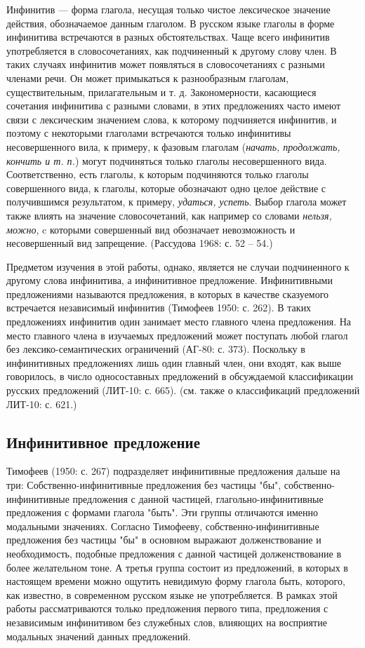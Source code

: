 Инфинитив --- форма глагола, несущая только чистое лексическое значение действия, обозначаемое данным глаголом. В русском языке глаголы в форме инфинитива встречаются в разных обстоятельствах. Чаще всего инфинитив употребляется в словосочетаниях, как подчиненный к другому слову член. В таких случаях инфинитив может появляться в словосочетаниях с разными членами речи. Он может примыкаться к разнообразным глаголам, существительным, прилагательным и т. д. Закономерности, касающиеся сочетания инфинитива с разными словами, в этих предложениях часто имеют связи с лексическим значением слова, к которому подчиняется инфинитив, и поэтому с некоторыми глаголами встречаются только инфинитивы несовершенного вила, к примеру, к фазовым глаголам (\textit{начать, продолжать, кончить и т. п.}) могут подчиняться только глаголы несовершенного вида. Соответственно, есть глаголы, к которым подчиняются только глаголы совершенного вида, к глаголы, которые обозначают одно целое действие с получившимся результатом, к примеру, \textit{удаться, успеть}. Выбор глагола может также влиять на значение словосочетаний, как например со словами \textit{нельзя, можно}, c которыми совершенный вид обозначает невозможность и несовершенный вид запрещение. (Рассудова 1968: с. 52 -- 54.)

Предметом изучения в этой работы, однако, является не случаи подчиненного к другому слова инфинитива, а инфинитивное предложение. Инфинитивными предложениями называются предложения, в которых в качестве сказуемого встречается независимый инфинитив (Тимофеев 1950: с. 262). В таких предложениях инфинитив один занимает место главного члена предложения. На место главного члена в изучаемых предложений может поступать любой глагол без лексико-семантических ограничений (АГ-80: с. 373). Поскольку в инфинитивных предложениях лишь один главный член, они входят, как выше говорилось, в число односоставных предложений в обсуждаемой классификации русских предложений (ЛИТ-10: с. 665). (см. также о классификаций предложений ЛИТ-10: с. 621.)

\subsection{Инфинитивное предложение}



Тимофеев (1950: с. 267) подразделяет инфинитивные предложения дальше на три: Собственно-инфинитивные предложения без частицы "бы", собственно-инфинитивные предложения с данной частицей, глагольно-инфинитивные предложения с формами глагола "быть". Эти группы отличаются именно модальными значениях. Согласно Тимофееву, собственно-инфинитивные предложения без частицы "бы" в основном выражают долженствование и необходимость, подобные предложения с данной частицей долженствование в более желательном тоне. А третья группа состоит из предложений, в которых в настоящем времени можно ощутить невидимую форму глагола быть, которого, как известно, в современном русском языке не употребляется. В рамках этой работы рассматриваются только предложения первого типа, предложения с независимым инфинитивом без служебных слов, влияющих на восприятие модальных значений данных предложений. 


